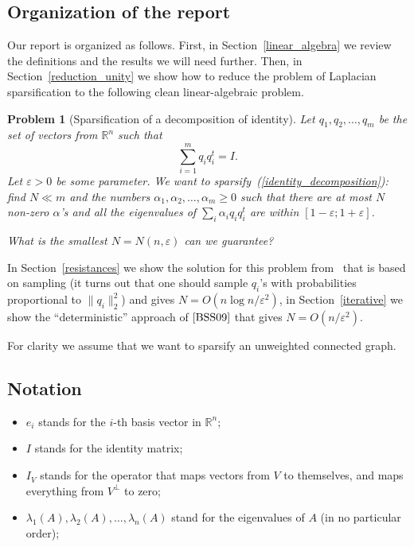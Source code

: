 \documentclass[12pt]{article}
\newcommand{\eps}{\varepsilon}
\newtheorem{problem}{Problem}
\begin{document}
    \subsection{Organization of the report}

    Our report is organized as follows. First, in Section~\ref{linear_algebra} we review the definitions and the results
    we will need further. Then, in Section~\ref{reduction_unity} we show how to reduce the problem of Laplacian
    sparsification to the following clean linear-algebraic problem.
    \begin{problem}[Sparsification of a decomposition of identity]
        Let $q_1, q_2, \ldots, q_m$ be the set of vectors from $\mathbb{R}^n$ such that
        \begin{equation}
            \label{identity_decomposition}
            \sum_{i=1}^m q_i q_i^t = I.
        \end{equation}
        Let $\eps > 0$ be some parameter. We want to sparsify~(\ref{identity_decomposition}): find $N \ll m$ and
        the numbers $\alpha_1, \alpha_2, \ldots, \alpha_m \geq 0$ such that there are at most $N$ non-zero
        $\alpha$'s and all the eigenvalues of $\sum_i \alpha_i q_i q_i^t$ are within $[1 - \eps; 1 + \eps]$.

        What is the smallest $N = N(n, \eps)$ can we guarantee?
    \end{problem}

    In Section~\ref{resistances} we show the solution for this problem from~\cite{SS11} that is based on sampling
    (it turns out that one should sample $q_i$'s with probabilities proportional to $\|q_i\|_2^2$)
    and gives $N = O(n \log n / \eps^2)$, in Section~\ref{iterative} we show the ``deterministic'' approach of
    $\cite{BSS09}$ that gives $N = O(n / \eps^2)$.

    For clarity we assume that we want to sparsify an unweighted connected graph.

    \subsection{Notation}

    \begin{itemize}
        \item $e_i$ stands for the $i$-th basis vector in $\mathbb{R}^n$;
        \item $I$ stands for the identity matrix;
        \item $I_V$ stands for the operator that maps vectors from $V$ to themselves, and
        maps everything from $V^{\perp}$ to zero;
        \item $\lambda_1(A), \lambda_2(A), \ldots, \lambda_n(A)$ stand for the eigenvalues
        of $A$ (in no particular order);
    \end{itemize}
\end{document}
